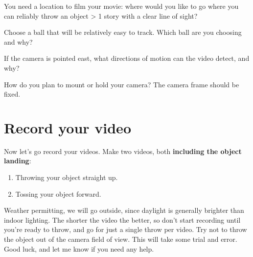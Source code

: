 \documentclass{handout}
\begin{document}
\begin{questions}
\question You need a location to film your movie: where would you like to go where you can reliably throw an object > 1 story with a clear line of sight?
\answerspace{2in}

\question Choose a ball that will be relatively easy to track. Which ball are you choosing and why? 

\answerspace{2in}

\question If the camera is pointed east, what directions of motion can the video detect, and why?

\question How do you plan to mount or hold your camera? The camera frame should be fixed.

\answerspace{2in}

\end{questions}

\section*{Record your video}
Now let’s go record your videos. Make two videos, both \textbf{including the object landing}:
\begin{enumerate}
    \item Throwing your object straight up.
    \item Tossing your object forward.
\end{enumerate}
Weather permitting, we will go outside, since daylight is generally brighter
than indoor lighting. The shorter the video the better, so don’t start recording
until you’re ready to throw, and go for just a single throw per video. Try not
to throw the object out of the camera field of view. This will take some trial
and error. Good luck, and let me know if you need any help.
\end{document}
